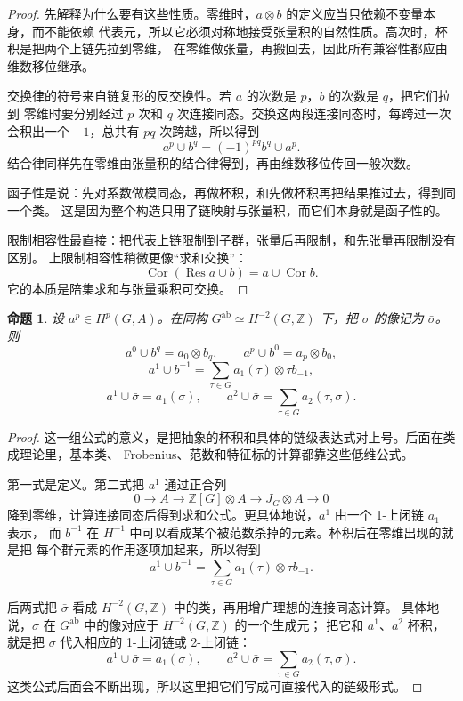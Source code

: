 \documentclass[11pt,a4paper,openany]{ctexbook}
\numberwithin{equation}{chapter}
\newcommand{\Z}{\mathbb{Z}}
\theoremstyle{plain}
\newtheorem{proposition}[theorem]{命题}
\theoremstyle{definition}
\theoremstyle{remark}
\begin{document}
\begin{proof}
先解释为什么要有这些性质。零维时，$a\otimes b$ 的定义应当只依赖不变量本身，而不能依赖
代表元，所以它必须对称地接受张量积的自然性质。高次时，杯积是把两个上链先拉到零维，
在零维做张量，再搬回去，因此所有兼容性都应由维数移位继承。

交换律的符号来自链复形的反交换性。若 $a$ 的次数是 $p$，$b$ 的次数是 $q$，把它们拉到
零维时要分别经过 $p$ 次和 $q$ 次连接同态。交换这两段连接同态时，每跨过一次会积出一个
$-1$，总共有 $pq$ 次跨越，所以得到
\[
 a^p\cup b^q=(-1)^{pq}b^q\cup a^p.
\]
结合律同样先在零维由张量积的结合律得到，再由维数移位传回一般次数。

函子性是说：先对系数做模同态，再做杯积，和先做杯积再把结果推过去，得到同一个类。
这是因为整个构造只用了链映射与张量积，而它们本身就是函子性的。

限制相容性最直接：把代表上链限制到子群，张量后再限制，和先张量再限制没有区别。
上限制相容性稍微更像“求和交换”：
\[
\operatorname{Cor}(\operatorname{Res}a\cup b)=a\cup\operatorname{Cor}b.
\]
它的本质是陪集求和与张量乘积可交换。
\end{proof}

\begin{proposition}
设 $a^p\in H^p(G,A)$。在同构 $G^{\operatorname{ab}}\simeq H^{-2}(G,\Z)$ 下，把 $\sigma$ 的像记为 $\bar\sigma$。则
\[
 a^0\cup b^q=a_0\otimes b_q,\qquad
 a^p\cup b^0=a_p\otimes b_0,
\]
\[
 a^1\cup b^{-1}=\sum_{\tau\in G}a_1(\tau)\otimes \tau b_{-1},
\]
\[
 a^1\cup\bar\sigma=a_1(\sigma),
\qquad
 a^2\cup\bar\sigma=\sum_{\tau\in G}a_2(\tau,\sigma).
\]
\end{proposition}

\begin{proof}
这一组公式的意义，是把抽象的杯积和具体的链级表达式对上号。后面在类成理论里，基本类、
Frobenius、范数和特征标的计算都靠这些低维公式。

第一式是定义。第二式把 $a^1$ 通过正合列
\[
 0\to A\to \Z[G]\otimes A\to J_G\otimes A\to0
\]
降到零维，计算连接同态后得到求和公式。更具体地说，$a^1$ 由一个 1-上闭链 $a_1$ 表示，
而 $b^{-1}$ 在 $H^{-1}$ 中可以看成某个被范数杀掉的元素。杯积后在零维出现的就是把
每个群元素的作用逐项加起来，所以得到
\[
 a^1\cup b^{-1}=\sum_{\tau\in G}a_1(\tau)\otimes \tau b_{-1}.
\]

后两式把 $\bar\sigma$ 看成 $H^{-2}(G,\Z)$ 中的类，再用增广理想的连接同态计算。
具体地说，$\sigma$ 在 $G^{\mathrm{ab}}$ 中的像对应于 $H^{-2}(G,\Z)$ 的一个生成元；
把它和 $a^1$、$a^2$ 杯积，就是把 $\sigma$ 代入相应的 1-上闭链或 2-上闭链：
\[
 a^1\cup\bar\sigma=a_1(\sigma),\qquad
 a^2\cup\bar\sigma=\sum_{\tau\in G}a_2(\tau,\sigma).
\]
这类公式后面会不断出现，所以这里把它们写成可直接代入的链级形式。
\end{proof}
\end{document}
